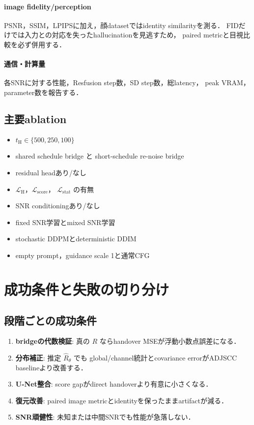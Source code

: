 \documentclass[11pt,a4paper]{ltjsarticle}
\begin{document}
\paragraph{image fidelity/perception}
PSNR，SSIM，LPIPSに加え，顔datasetではidentity similarityを測る．
FIDだけでは入力との対応を失ったhallucinationを見逃すため，
paired metricと目視比較を必ず併用する．

\paragraph{通信・計算量}
各SNRに対する性能，Resfusion step数，SD step数，総latency，
peak VRAM，parameter数を報告する．

\subsection{主要ablation}

\begin{itemize}
  \item \(t_{\mathrm H}\in\{500,250,100\}\)
  \item shared schedule bridge と short-schedule re-noise bridge
  \item residual headあり/なし
  \item \(\mathcal L_{\mathrm H}\)，\(\mathcal L_{\mathrm{score}}\)，
        \(\mathcal L_{\mathrm{stat}}\) の有無
  \item SNR conditioningあり/なし
  \item fixed SNR学習とmixed SNR学習
  \item stochastic DDPMとdeterministic DDIM
  \item empty prompt，guidance scale 1と通常CFG
\end{itemize}

\section{成功条件と失敗の切り分け}

\subsection{段階ごとの成功条件}

\begin{enumerate}
  \item \textbf{bridgeの代数検証}: 真の \(R\) ならhandover MSEが浮動小数点誤差になる．
  \item \textbf{分布補正}: 推定 \(\hat R_\theta\) でも
        global/channel統計とcovariance errorがADJSCC baselineより改善する．
  \item \textbf{U-Net整合}: score gapがdirect handoverより有意に小さくなる．
  \item \textbf{復元改善}: paired image metricとidentityを保ったままartifactが減る．
  \item \textbf{SNR頑健性}: 未知または中間SNRでも性能が急落しない．
\end{enumerate}
\end{document}
